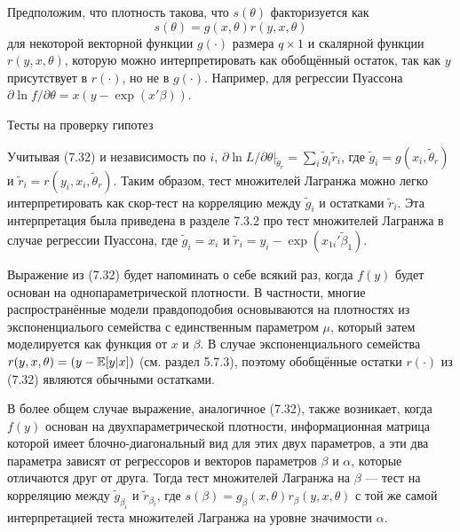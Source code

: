 Предположим, что плотность такова, что $s(\theta)$ факторизуется как
\begin{equation}
s(\theta) = g(x, \theta)r(y, x, \theta)
\end{equation}
для некоторой векторной функции $g(\cdot)$ размера $q \times 1$ и скалярной функции $r(y, x, \theta)$, которую можно интерпретировать как обобщённый остаток, так как $y$ присутствует в $r(\cdot)$, но не в $g(\cdot)$. Например, для регрессии Пуассона $\partial{\ln f}/\partial{\theta} = x(y - \exp(x'\beta))$.

\begin{center}
Тесты на проверку гипотез
\end{center}

Учитывая (7.32) и независимость по $i$, $\partial{\ln L}/\partial{\theta}|_{\tilde{\theta}_r} = \sum_i \tilde{g}_i\tilde{r}_i$, где $\tilde{g}_i = g(x_i, \tilde{\theta}_r)$ и $\tilde{r}_i = r(y_i, x_i, \tilde{\theta}_r)$. Таким образом, тест множителей Лагранжа можно легко интерпретировать как скор-тест на корреляцию между $\tilde{g}_i$ и остатками $\tilde{r}_i$. Эта интерпретация была приведена в разделе 7.3.2 про тест множителей Лагранжа в случае регрессии Пуассона, где $\tilde{g}_i = x_i$ и $\tilde{r}_i = y_i - \exp(x_{1i}'\tilde{\beta}_1)$.

Выражение из (7.32) будет напоминать о себе всякий раз, когда $f(y)$ будет основан на однопараметрической плотности. В частности, многие распространённые модели правдоподобия основываются на плотностях из экспоненциалього семейства с единственным параметром $\mu$, который затем моделируется как функция от $x$ и $\beta$. В случае экспоненциального семейства  $r(y, x, \theta) = (y - \mathbb{E}[y|x]) $ (см. раздел 5.7.3), поэтому обобщённые остатки $r(\cdot)$ из (7.32) являются обычными остатками.

В более общем случае выражение, аналогичное (7.32), также возникает, когда $f(y)$ основан на двухпараметрической плотности, информационная матрица которой имеет блочно-диагональный вид для этих двух параметров, а эти два параметра зависят от регрессоров и векторов параметров $\beta$ и $\alpha$, которые отличаются друг от друга. Тогда тест множителей Лагранжа на $\beta$ --- тест на корреляцию между $\tilde{g}_{\beta_i}$ и $\tilde{r}_{\beta_i}$, где $s(\beta) = g_{\beta}(x, \theta)r_{\beta}(y, x, \theta)$ с той же самой интерпретацией теста множителей Лагранжа на уровне значимости $\alpha$.

